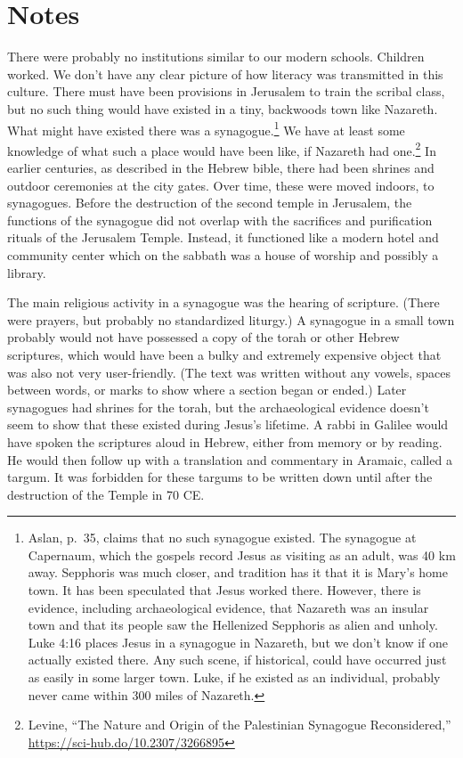 \documentclass[10pt,a5paper,twoside]{article}
\newcommand{\quotesize}{\normalsize{}}
\newcommand{\maintextquotesize}{\renewcommand{\quotesize}{\large{}}}
\newcommand{\notequotesize}{\renewcommand{\quotesize}{\normalsize{}}}
\newenvironment{notesection}[1]{
  \setcounter{secnumdepth}{0}          %
  \section*{#1}
  \setcounter{secnumdepth}{2}          %
  \notequotesize
}%
{
  \maintextquotesize
}
\begin{document}
\begin{notesection}{Notes}
There were probably no institutions similar to our modern schools. Children worked. We don't have any clear picture of how
literacy was transmitted in this culture. There must have been provisions
in Jerusalem to train the scribal class, but no such thing would have existed in a tiny,
backwoods town like Nazareth. What might have existed there was a synagogue.\footnote{Aslan, p.~35, claims that no such synagogue existed. The
synagogue at Capernaum, which the gospels record Jesus as visiting as an adult, was 40 km away. Sepphoris was much closer,
and tradition has it that it is Mary's home town. It has been speculated that Jesus worked there. However, there is evidence, including
archaeological evidence, that Nazareth was an insular town and that its people saw the Hellenized Sepphoris as alien and unholy.
Luke 4:16 places Jesus in a synagogue in
Nazareth, but we don't know if one actually existed there. Any such scene, if historical,
could have occurred just as easily in some larger town. Luke, if he existed as an individual,
probably never came within 300 miles of Nazareth.}
We have at least some knowledge of what such a place would have been like, if Nazareth had 
one.\footnote{Levine, ``The Nature and Origin of the Palestinian Synagogue Reconsidered,'' \url{https://sci-hub.do/10.2307/3266895}}
In earlier centuries, as described in the Hebrew bible, there had been shrines and outdoor ceremonies
at the city gates. Over time, these were moved indoors, to synagogues. Before the destruction of
the second temple in Jerusalem, the functions of the synagogue
did not overlap with the sacrifices and purification rituals of the Jerusalem Temple. Instead, it
functioned like a modern hotel and community center which on the sabbath was a house of worship and
possibly a library.

The main religious activity in a synagogue was the hearing of scripture. (There were prayers, but
probably no standardized liturgy.) A synagogue in a small town probably would not have possessed
a copy of the torah or other Hebrew scriptures, which would have been a bulky and extremely expensive object that was
also not very user-friendly. (The text was written without any vowels, spaces between words, or marks
to show where a section began or ended.) Later synagogues had shrines for the torah, but the archaeological
evidence doesn't seem to show that these existed during Jesus's lifetime.
A rabbi in Galilee would have spoken the scriptures aloud in Hebrew, either from memory or by reading.
He would then follow up with a translation and commentary in Aramaic, called a targum. It
was forbidden for these targums to be written down until after the destruction of the Temple in 70 CE.


\end{notesection}
\end{document}
